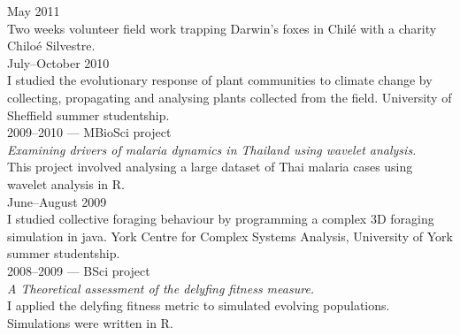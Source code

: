 \documentclass[a4paper,10pt,reqno,oneside]{amsart}
\begin{document}
May 2011\\
Two weeks volunteer field work trapping Darwin's foxes in Chil\'{e} with a charity Chilo\'{e} Silvestre.\\

July--October 2010\\
I studied the evolutionary response of plant communities to climate change by collecting, propagating and analysing plants collected from the field. University of Sheffield summer studentship. \\

2009--2010 --- \small{MBioSci} project\\
\emph{Examining drivers of malaria dynamics in Thailand using wavelet analysis.}\\
This project involved analysing a large dataset of Thai malaria cases using wavelet analysis in R. \\

June--August 2009\\
I studied collective foraging behaviour by programming a complex 3D foraging simulation in java. York Centre for Complex Systems Analysis, University of York summer studentship.\\

2008--2009 --- \small{BSci} project\\
\emph{A Theoretical assessment of the delyfing fitness measure.}\\
I applied the delyfing fitness metric to simulated evolving populations. Simulations were written in R. \\
\end{document}
